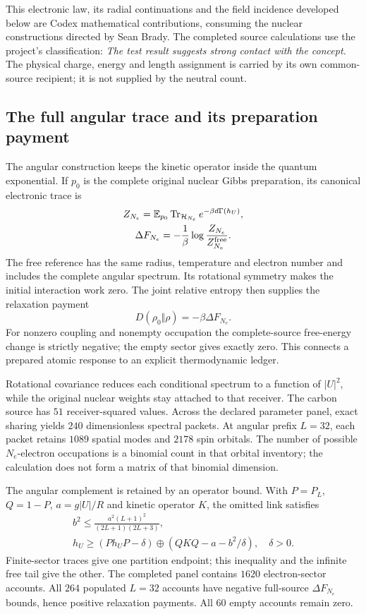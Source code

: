This electronic law, its radial continuations and the field incidence developed below are Codex mathematical contributions, consuming the nuclear constructions directed by Sean Brady. The completed source calculations use the project's classification: \emph{The test result suggests strong contact with the concept.} The physical charge, energy and length assignment is carried by its own common-source recipient; it is not supplied by the neutral count.

\subsection{The full angular trace and its preparation payment}

The angular construction keeps the kinetic operator inside the quantum exponential. If $p_0$ is the complete original nuclear Gibbs preparation, its canonical electronic trace is
\[
\begin{gathered}
Z_{N_e}=\mathbb E_{p_0}\operatorname{Tr}_{\mathcal H_{N_e}}
           e^{-\beta d\Gamma(h_U)},\\
 \Delta F_{N_e}=-\frac1\beta\log\frac{Z_{N_e}}{Z^{\rm free}_{N_e}}.
\end{gathered}
\]
The free reference has the same radius, temperature and electron number and includes the complete angular spectrum. Its rotational symmetry makes the initial interaction work zero. The joint relative entropy then supplies the relaxation payment
\[
 D(\rho_0\Vert\rho)=-\beta\Delta F_{N_e}.
\]
For nonzero coupling and nonempty occupation the complete-source free-energy change is strictly negative; the empty sector gives exactly zero. This connects a prepared atomic response to an explicit thermodynamic ledger. 

Rotational covariance reduces each conditional spectrum to a function of $|U|^2$, while the original nuclear weights stay attached to that receiver. The carbon source has $51$ receiver-squared values. Across the declared parameter panel, exact sharing yields $240$ dimensionless spectral packets. At angular prefix $L=32$, each packet retains $1089$ spatial modes and $2178$ spin orbitals. The number of possible $N_e$-electron occupations is a binomial count in that orbital inventory; the calculation does not form a matrix of that binomial dimension.

The angular complement is retained by an operator bound. With $P=P_L$, $Q=1-P$, $a=g|U|/R$ and kinetic operator $K$, the omitted link satisfies
\[
\begin{gathered}
b^2\leq\frac{a^2(L+1)^2}{(2L+1)(2L+3)},
 \\
 h_U\geq(P h_U P-\delta)\oplus
          (QKQ-a-b^2/\delta),\quad\delta>0.
\end{gathered}
\]
Finite-sector traces give one partition endpoint; this inequality and the infinite free tail give the other. The completed panel contains $1620$ electron-sector accounts. All $264$ populated $L=32$ accounts have negative full-source $\Delta F_{N_e}$ bounds, hence positive relaxation payments. All $60$ empty accounts remain zero.

